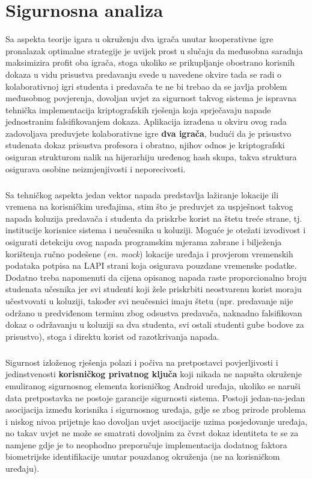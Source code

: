 \chapter{Sigurnosna analiza} \label{chapter:sec}
Sa aspekta teorije igara\cite{davis2012game} u okruženju dva igrača unutar kooperativne igre\cite{nash1953two} pronalazak optimalne strategije je uvijek prost u slučaju da međusobna saradnja maksimizira profit oba igrača, stoga ukoliko se prikupljanje obostrano korisnih dokaza u vidu prisustva predavanju svede u navedene okvire tada se radi o kolaborativnoj igri studenta i predavača te ne bi trebao da se javlja problem međusobnog povjerenja, dovoljan uvjet za sigurnost takvog sistema je ispravna tehnička implementacija kriptografskih rješenja koja sprječavaju napade jednostranim falsifikovanjem dokaza. Aplikacija izrađena u okviru ovog rada zadovoljava preduvjete kolaborativne igre \textbf{dva igrača}, budući da je prisustvo studenata dokaz prisustva profesora i obratno, njihov odnos je kriptografski osiguran strukturom nalik na hijerarhiju uređenog hash skupa, takva struktura osigurava osobine neizmjenjivosti i neporecivosti.

\paragraph*{}
Sa tehničkog aspekta jedan vektor napada predstavlja lažiranje lokacije ili vremena na korisničkim uređajima, stim što je preduvjet za uspješnost takvog napada koluzija predavača i studenta da priskrbe korist na štetu treće strane, tj. institucije korisnice sistema i neučesnika u koluziji. Moguće je otežati izvodivost i osigurati detekciju ovog napada programskim mjerama zabrane i bilježenja korištenja ručno podešene (\textit{en. mock}) lokacije uređaja i provjerom vremenskih podataka potpisa na LAPI strani koja osigurava pouzdane vremenske podatke. Dodatno treba napomenuti da cijena opisanog napada raste proporcionalno broju studenata učesnika jer svi studenti koji žele priskrbiti neostvarenu korist moraju učestvovati u koluziji, također svi neučesnici imaju štetu (npr. predavanje nije održano u predviđenom terminu zbog odsustva predavača, naknadno falsifikovan dokaz o održavanju u koluziji sa dva studenta, svi ostali studenti gube bodove za prisustvo), stoga i direktu korist od razotkrivanja napada.

\paragraph*{}
Sigurnost izloženog rješenja polazi i počiva na pretpostavci povjerljivosti i jedinstvenosti \textbf{korisničkog privatnog ključa} koji nikada ne napušta okruženje emuliranog sigurnosnog elementa korisničkog Android uređaja, ukoliko se naruši data pretpostavka ne postoje garancije sigurnosti sistema. Postoji jedan-na-jedan asocijacija između korisnika i sigurnosnog uređaja, gdje se zbog prirode problema i niskog nivoa prijetnje kao dovoljan uvjet asocijacije uzima posjedovanje uređaja, no takav uvjet ne može se smatrati dovoljnim za čvrst dokaz identiteta te se za namjene gdje je to neophodno preporučuje implementacija dodatnog faktora biometrijske identifikacije unutar pouzdanog okruženja (ne na korisničkom uređaju).